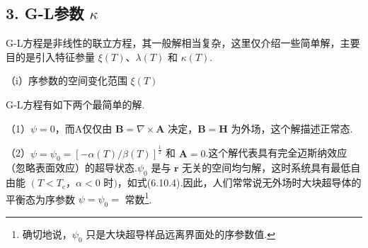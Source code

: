 \subsection*{3. G-L参数 $\kappa$}

G-L方程是非线性的联立方程，其一般解相当复杂，这里仅介绍一些简单解，主要目的是引入特征参量 $\xi(T)$、$\lambda(T)$ 和 $\kappa(T)$.

（i）序参数的空间变化范围 $\xi(T)$

G-L方程有如下两个最简单的解.

（1）$\psi=0$，而A仅仅由 $\boldsymbol{B}=\nabla\times\boldsymbol{A}$ 决定，$\boldsymbol{B}=\boldsymbol{H}$ 为外场，这个解描述正常态.

（2）$\psi=\psi_{0}=\left[-\alpha(T)/\beta(T)\right]^{\frac{1}{2}}$ 和 $\boldsymbol{A}=0$.这个解代表具有完全迈斯纳效应（忽略表面效应）的超导状态.$\psi_{0}$ 是与 $\boldsymbol{r}$ 无关的空间均匀解，这时系统具有最低自由能 $\left(T<T_{\mathrm{c}}\right.$，$\left.\alpha<0\right.$ 时$)$，如式(6.10.4).因此，人们常常说无外场时大块超导体的平衡态为序参数 $\psi=\psi_{0}=$ 常数\footnote{确切地说，$\psi_{0}$ 只是大块超导样品远离界面处的序参数值.}.

